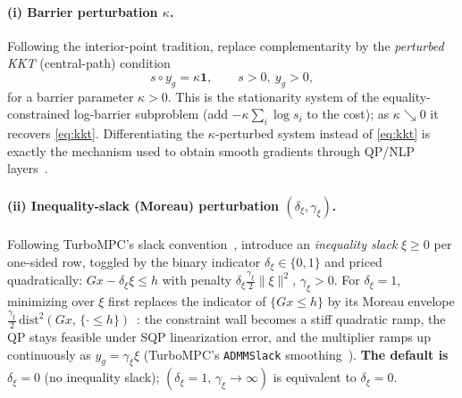 \documentclass[10pt,twocolumn]{article}
\newcommand{\ones}{\mathbf{1}}
\begin{document}
\paragraph{(i) Barrier perturbation $\kappa$.} Following the interior-point
tradition, replace complementarity by the \emph{perturbed KKT} (central-path)
condition~\cite[Ch.~19]{nw}
\begin{equation}
\label{eq:centralpath}
s \circ y_g = \kappa\ones, \qquad s > 0,\ y_g > 0,
\end{equation}
for a barrier parameter $\kappa > 0$. This is the stationarity system of the
equality-constrained log-barrier subproblem (add $-\kappa\sum_i\log s_i$ to the
cost); as $\kappa\searrow 0$ it recovers \eqref{eq:kkt}. Differentiating the
$\kappa$-perturbed system instead of \eqref{eq:kkt} is exactly the mechanism used to
obtain smooth gradients through QP/NLP layers~\cite{tracy,frey}.

\paragraph{(ii) Inequality-slack (Moreau) perturbation $(\delta_\xi,\gamma_\xi)$.}
Following TurboMPC's slack convention~\cite{turbompc}, introduce an
\emph{inequality slack} $\xi \ge 0$ per one-sided row, toggled by the binary
indicator $\delta_\xi\in\{0,1\}$ and priced quadratically:
$Gx - \delta_\xi\xi \le h$ with penalty $\delta_\xi\tfrac{\gamma_\xi}{2}\|\xi\|^2$,
$\gamma_\xi > 0$. For $\delta_\xi = 1$, minimizing over $\xi$ first replaces the
indicator of $\{Gx\le h\}$ by its Moreau envelope
$\tfrac{\gamma_\xi}{2}\,\mathrm{dist}^2(Gx,\,\{\cdot\le h\})$~\cite{parikh}: the
constraint wall becomes a stiff quadratic ramp, the QP stays feasible under SQP
linearization error, and the multiplier ramps up continuously as
$y_g = \gamma_\xi\xi$ (TurboMPC's \texttt{ADMMSlack} smoothing~\cite{turbompc}).
\textbf{The default is $\delta_\xi = 0$} (no inequality slack);
$(\delta_\xi{=}1,\,\gamma_\xi{\to}\infty)$ is equivalent to $\delta_\xi = 0$.
\end{document}

